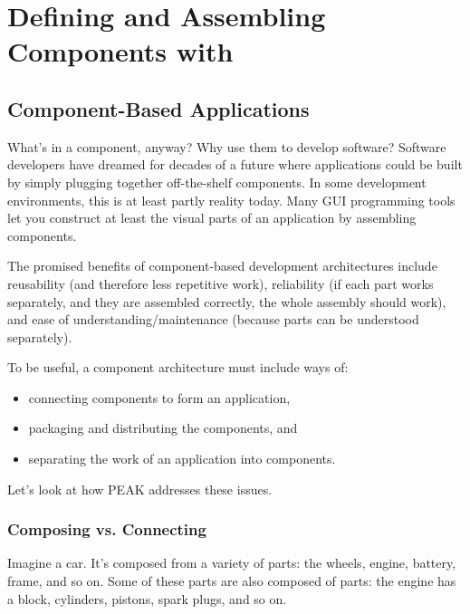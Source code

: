 \chapter{Defining and Assembling Components with }

\section{Component-Based Applications}

What's in a component, anyway?  Why use them to develop software?  Software
developers have dreamed for decades of a future where applications could be
built by simply plugging together off-the-shelf components.  In some
development environments, this is at least partly reality today.  Many GUI
programming tools let you construct at least the visual parts of an 
application by assembling components.

The promised benefits of component-based development architectures include
reusability (and therefore less repetitive work), reliability (if each part
works separately, and they are assembled correctly, the whole assembly should
work), and ease of understanding/maintenance (because parts can be understood
separately).

To be useful, a component architecture must include ways of:

\begin{itemize}

\item connecting components to form an application,

\item packaging and distributing the components, and

\item separating the work of an application into components.

\end{itemize}

Let's look at how PEAK addresses these issues.











\subsection{Composing vs. Connecting}

Imagine a car.  It's composed from a variety of parts: the wheels, engine, 
battery, frame, and so on.  Some of these parts are also composed of parts:
the engine has a block, cylinders, pistons, spark plugs, and so on.

